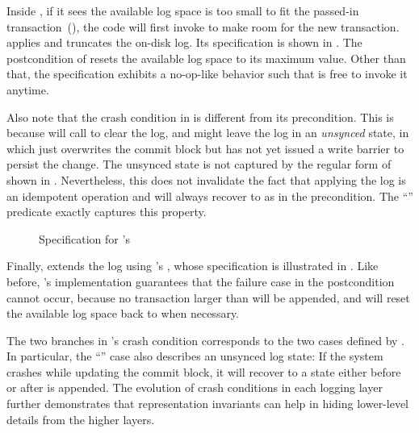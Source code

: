 Inside , if it sees the available log space 
is too small to fit the passed-in transaction~(), the code will first
invoke  to make room for the new transaction.
 applies and truncates the on-disk log. Its
specification is shown in .  The postcondition
of  resets the available log space to its maximum value.
Other than that, the specification exhibits a no-op-like behavior such that
\memlog is free to invoke it anytime. 

Also note that the crash condition in  is
different from its precondition. This is because  will
call  to clear the log, and 
might leave the log in an \emph{unsynced} state, in which \disklog just
overwrites the commit block but has not yet issued a write barrier to
persist the change.  The unsynced state is not captured by the regular form
of  shown in .  Nevertheless, this
does not invalidate the fact that applying the log is an idempotent
operation and will always recover to  as in the
precondition. The ``'' predicate exactly
captures this property.

\begin{figure}[htb]
\begin{spec}
\end{spec}
\caption{Specification for \memlog's }
\label{fig:spec_applier_apply}
\end{figure}

Finally,  extends the log using \disklog's
, whose specification is illustrated in
. Like before, \syslog's implementation
guarantees that the failure case in the postcondition cannot occur, because
no transaction larger than  will be appended, and
 will reset the available log space back to
 when necessary.  

The two branches in 's crash condition
corresponds to the two cases defined by .  In
particular, the ``'' case also describes an unsynced log
state: If the system crashes while updating the commit block, it will
recover to a state either before or after  is appended.  The
evolution of crash conditions in each logging layer further demonstrates
that representation invariants can help in hiding lower-level details from
the higher layers.

